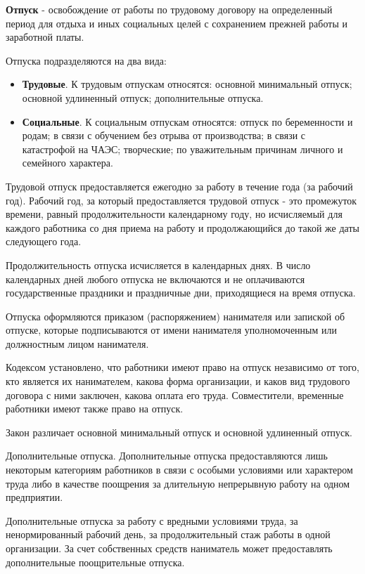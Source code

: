 \documentclass[14pt,a4paper]{extarticle}
\begin{document}
\textbf{Отпуск} - освобождение от работы по трудовому договору на определенный период для отдыха и иных социальных целей с сохранением прежней работы и заработной платы.

Отпуска подразделяются на два вида:\
\begin{itemize}
	\item \textbf{Трудовые}. К трудовым отпускам относятся: основной минимальный отпуск; основной удлиненный отпуск; дополнительные отпуска.
	\item \textbf{Социальные}. К социальным отпускам относятся: отпуск по беременности и родам; в связи с обучением без отрыва от производства; в связи с катастрофой на ЧАЭС; творческие; по уважительным причинам личного и семейного характера.
\end{itemize}

Трудовой отпуск предоставляется ежегодно за работу в течение года (за рабочий год). Рабочий год, за который предоставляется трудовой отпуск - это промежуток времени, равный продолжительности календарному году, но исчисляемый для каждого работника со дня приема на работу и продолжающийся до такой же даты следующего года.

Продолжительность отпуска исчисляется в календарных днях. В число календарных дней любого отпуска не включаются и не оплачиваются государственные праздники и праздничные дни, приходящиеся на время отпуска.

Отпуска оформляются приказом (распоряжением) нанимателя или запиской об отпуске, которые подписываются от имени нанимателя уполномоченным или должностным лицом нанимателя.

Кодексом установлено, что работники имеют право на отпуск независимо от того, кто является их нанимателем, какова форма организации, и каков вид трудового договора с ними заключен, какова оплата его труда. Совместители, временные работники имеют также право на отпуск.

Закон различает основной минимальный отпуск и основной удлиненный отпуск.

Дополнительные отпуска. Дополнительные отпуска предоставляются лишь некоторым категориям работников в связи с особыми условиями или характером труда либо в качестве поощрения за длительную непрерывную работу на одном предприятии.

Дополнительные отпуска за работу с вредными условиями труда, за ненормированный рабочий день, за продолжительный стаж работы в одной организации. За счет собственных средств наниматель может предоставлять дополнительные поощрительные отпуска.
\end{document}
